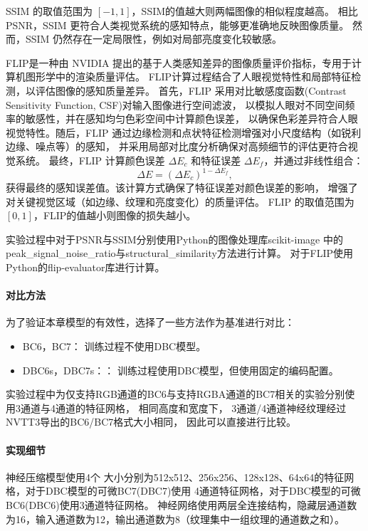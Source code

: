 SSIM 的取值范围为 $[-1,1]$，SSIM的值越大则两幅图像的相似程度越高。
相比PSNR，SSIM 更符合人类视觉系统的感知特点，能够更准确地反映图像质量。
然而，SSIM 仍然存在一定局限性，例如对局部亮度变化较敏感。

FLIP\cite{andersson2020flip}是一种由 NVIDIA 提出的基于人类感知差异的图像质量评价指标，专用于计算机图形学中的渲染质量评估。
FLIP计算过程结合了人眼视觉特性和局部特征检测，以评估图像的感知质量差异。
首先，FLIP 采用对比敏感度函数(Contrast Sensitivity Function, CSF)对输入图像进行空间滤波，
以模拟人眼对不同空间频率的敏感性，并在感知均匀色彩空间中计算颜色误差，
以确保色彩差异符合人眼视觉特性。随后，FLIP 通过边缘检测和点状特征检测增强对小尺度结构（如锐利边缘、噪点等）的感知，
并采用局部对比度分析确保对高频细节的评估更符合视觉系统。
最终，FLIP 计算颜色误差 $\Delta E_c$ 和特征误差 $\Delta E_f$，并通过非线性组合：
\begin{equation}
    \Delta E = (\Delta E_c)^{1 - \Delta E_f},
\end{equation}
获得最终的感知误差值。该计算方式确保了特征误差对颜色误差的影响，
增强了对关键视觉区域（如边缘、纹理和亮度变化）的质量评估。
FLIP 的取值范围为 $[0,1]$，FLIP的值越小则图像的损失越小。

实验过程中对于PSNR与SSIM分别使用Python的图像处理库scikit-image\cite{scikit-image}
中的peak\_signal\_noise\_ratio与structural\_similarity方法进行计算。
对于FLIP使用Python的flip-evaluator库进行计算。

\paragraph{对比方法}

为了验证本章模型的有效性，选择了一些方法作为基准进行对比：

\begin{itemize}
\item BC6，BC7： 训练过程不使用DBC模型。
\item DBC6s，DBC7s：： 训练过程使用DBC模型，但使用固定的编码配置。
\end{itemize}

实验过程中为仅支持RGB通道的BC6与支持RGBA通道的BC7相关的实验分别使用3通道与4通道的特征网格，
相同高度和宽度下，
3通道/4通道神经纹理经过NVTT3导出的BC6/BC7格式大小相同，
因此可以直接进行比较。

\paragraph{实现细节}

神经压缩模型使用4个
大小分别为512x512、256x256、128x128、64x64的特征网格，对于DBC模型的可微BC7(DBC7)使用
4通道特征网格，对于DBC模型的可微BC6(DBC6)使用3通道特征网格。
神经网络使用两层全连接结构，隐藏层通道数为16，输入通道数为12，输出通道数为8（纹理集中一组纹理的通道数之和）。

